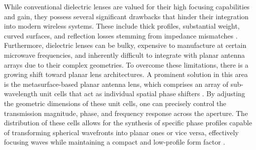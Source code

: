 
While conventional dielectric lenses are valued for their high focusing capabilities and gain, they possess several significant drawbacks that hinder their integration into modern wireless systems. These include thick profiles, substantial weight, curved surfaces, and reflection losses stemming from impedance mismatches \cite{Al-Joumayly2011}. Furthermore, dielectric lenses can be bulky, expensive to manufacture at certain microwave frequencies, and inherently difficult to integrate with planar antenna arrays due to their complex geometries. To overcome these limitations, there is a growing shift toward planar lens architectures. A prominent solution in this area is the metasurface-based planar antenna lens, which comprises an array of sub-wavelength unit cells that act as individual spatial phase shifters \cite{Al-Joumayly2011}. By adjusting the geometric dimensions of these unit cells, one can precisely control the transmission magnitude, phase, and frequency response across the aperture. The distribution of these cells allows for the synthesis of specific phase profiles capable of transforming spherical wavefronts into planar ones or vice versa, effectively focusing waves while maintaining a compact and low-profile form factor \cite{Al-Joumayly2011}.



